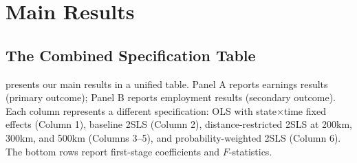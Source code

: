 \documentclass[12pt]{article}
\begin{document}
\section{Main Results}
\label{sec:results}

\subsection{The Combined Specification Table}

 presents our main results in a unified table. Panel A reports earnings results (primary outcome); Panel B reports employment results (secondary outcome). Each column represents a different specification: OLS with state$\times$time fixed effects (Column 1), baseline 2SLS (Column 2), distance-restricted 2SLS at 200km, 300km, and 500km (Columns 3--5), and probability-weighted 2SLS (Column 6). The bottom rows report first-stage coefficients and $F$-statistics.
\end{document}

